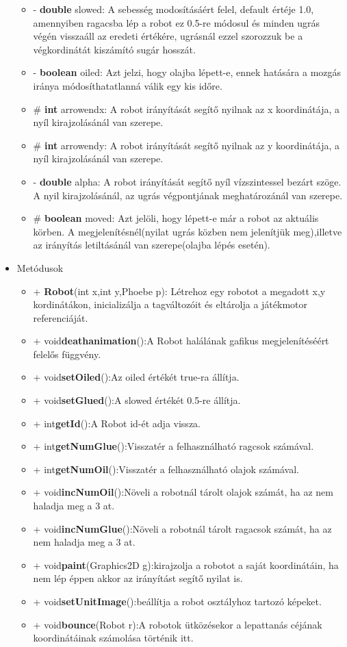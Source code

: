 \begin{itemize}
\begin{itemize}
		\item- \textbf{double} slowed: A sebesség modosításáért felel, default értéje 1.0, amennyiben ragacsba lép a robot ez 0.5-re módosul és minden ugrás végén visszaáll az eredeti értékére, ugrásnál ezzel szorozzuk be a végkordinátát kiszámító sugár hosszát.
		\item- \textbf{boolean} oiled: Azt jelzi, hogy olajba lépett-e, ennek hatására a mozgás iránya módosíthatatlanná válik egy kis időre. 
		\item\# \textbf{int} arrowendx: A robot irányítását segítő nyilnak az x koordinátája, a nyíl kirajzolásánál van szerepe.
		\item\# \textbf{int} arrowendy: A robot irányítását segítő nyilnak az y koordinátája, a nyíl kirajzolásánál van szerepe.
		\item- \textbf{double} alpha: A robot irányítását segítő nyíl vízszintessel bezárt szöge. A nyil kirajzolásánál, az ugrás végpontjának meghatározánál van szerepe.
		\item\# \textbf{boolean} moved: Azt jelöli, hogy lépett-e már a robot az aktuális körben. A megjelenítésnél(nyilat ugrás közben nem jelenítjük meg),illetve az irányítás letiltásánál van szerepe(olajba lépés esetén).
	
\end{itemize}
\item Metódusok\\
	\begin{itemize}
		\item+ \textbf{Robot}(int x,int y,Phoebe p): Létrehoz egy robotot a megadott x,y kordinátákon, inicializálja a tagváltozóit és eltárolja a játékmotor referenciáját.
		\item+ void\textbf{deathanimation}():A Robot halálának gafikus megjelenítéséért felelős függvény.
		\item+ void\textbf{setOiled}():Az oiled értékét true-ra állítja. 
		\item+ void\textbf{setGlued}():A slowed értékét 0.5-re állítja. 
		\item+ int\textbf{getId}():A Robot id-ét adja vissza.
		\item+ int\textbf{getNumGlue}():Visszatér a felhasználható ragcsok számával.
		\item+ int\textbf{getNumOil}():Visszatér a felhasználható olajok számával.
		\item+ void\textbf{incNumOil}():Növeli a robotnál tárolt olajok számát, ha az nem haladja meg a 3 at.
		\item+ void\textbf{incNumGlue}():Növeli a robotnál tárolt ragacsok számát, ha az nem haladja meg a 3 at.
	\item+ void\textbf{paint}(Graphics2D g):kirajzolja a robotot a saját koordinátáin, ha nem lép éppen akkor az irányítást segítő nyilat is.
	\item+ void\textbf{setUnitImage}():beállítja a robot osztályhoz tartozó képeket.
\item+ void\textbf{bounce}(Robot r):A robotok ütközésekor a lepattanás céjának  koordinátáinak számolása történik itt.


\end{itemize}
\end{itemize}
